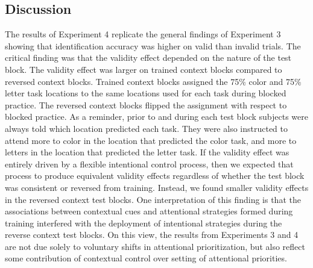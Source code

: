 \documentclass[english,,man,floatsintext]{apa6}
\begin{document}
\subsection{Discussion}\label{discussion-3}

The results of Experiment 4 replicate the general findings of Experiment
3 showing that identification accuracy was higher on valid than invalid
trials. The critical finding was that the validity effect depended on
the nature of the test block. The validity effect was larger on trained
context blocks compared to reversed context blocks. Trained context
blocks assigned the 75\% color and 75\% letter task locations to the
same locations used for each task during blocked practice. The reversed
context blocks flipped the assignment with respect to blocked practice.
As a reminder, prior to and during each test block subjects were always
told which location predicted each task. They were also instructed to
attend more to color in the location that predicted the color task, and
more to letters in the location that predicted the letter task. If the
validity effect was entirely driven by a flexible intentional control
process, then we expected that process to produce equivalent validity
effects regardless of whether the test block was consistent or reversed
from training. Instead, we found smaller validity effects in the
reversed context test blocks. One interpretation of this finding is that
the associations between contextual cues and attentional strategies
formed during training interfered with the deployment of intentional
strategies during the reverse context test blocks. On this view, the
results from Experiments 3 and 4 are not due solely to voluntary shifts
in attentional prioritization, but also reflect some contribution of
contextual control over setting of attentional priorities.
\end{document}
